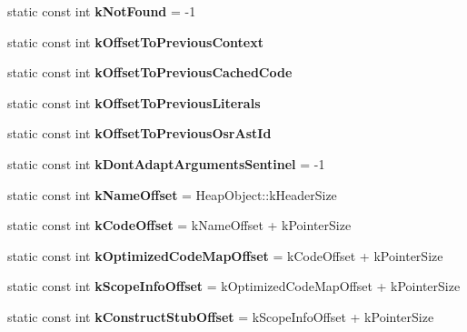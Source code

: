 \begin{DoxyCompactItemize}
\item 
static const int {\bfseries k\+Not\+Found} = -\/1\hypertarget{classv8_1_1internal_1_1_shared_function_info_a1e596df8d07293d1c359639d9b111b8f}{}\label{classv8_1_1internal_1_1_shared_function_info_a1e596df8d07293d1c359639d9b111b8f}

\item 
static const int {\bfseries k\+Offset\+To\+Previous\+Context}
\item 
static const int {\bfseries k\+Offset\+To\+Previous\+Cached\+Code}
\item 
static const int {\bfseries k\+Offset\+To\+Previous\+Literals}
\item 
static const int {\bfseries k\+Offset\+To\+Previous\+Osr\+Ast\+Id}
\item 
static const int {\bfseries k\+Dont\+Adapt\+Arguments\+Sentinel} = -\/1\hypertarget{classv8_1_1internal_1_1_shared_function_info_a64fb3ac3cd435626512d56ffb031af0f}{}\label{classv8_1_1internal_1_1_shared_function_info_a64fb3ac3cd435626512d56ffb031af0f}

\item 
static const int {\bfseries k\+Name\+Offset} = Heap\+Object\+::k\+Header\+Size\hypertarget{classv8_1_1internal_1_1_shared_function_info_a7ea21b5d46c5e7f44e66e3d26d1b600f}{}\label{classv8_1_1internal_1_1_shared_function_info_a7ea21b5d46c5e7f44e66e3d26d1b600f}

\item 
static const int {\bfseries k\+Code\+Offset} = k\+Name\+Offset + k\+Pointer\+Size\hypertarget{classv8_1_1internal_1_1_shared_function_info_ac7fe6404f9b3b09d90e90daa447751fb}{}\label{classv8_1_1internal_1_1_shared_function_info_ac7fe6404f9b3b09d90e90daa447751fb}

\item 
static const int {\bfseries k\+Optimized\+Code\+Map\+Offset} = k\+Code\+Offset + k\+Pointer\+Size\hypertarget{classv8_1_1internal_1_1_shared_function_info_a0994b68019409d0eb68a285ee9277cfc}{}\label{classv8_1_1internal_1_1_shared_function_info_a0994b68019409d0eb68a285ee9277cfc}

\item 
static const int {\bfseries k\+Scope\+Info\+Offset} = k\+Optimized\+Code\+Map\+Offset + k\+Pointer\+Size\hypertarget{classv8_1_1internal_1_1_shared_function_info_a51386ec5e82d6a4ca1f05663ea80de9d}{}\label{classv8_1_1internal_1_1_shared_function_info_a51386ec5e82d6a4ca1f05663ea80de9d}

\item 
static const int {\bfseries k\+Construct\+Stub\+Offset} = k\+Scope\+Info\+Offset + k\+Pointer\+Size\hypertarget{classv8_1_1internal_1_1_shared_function_info_a28d5211725c2457c7243651a8ad60793}{}\label{classv8_1_1internal_1_1_shared_function_info_a28d5211725c2457c7243651a8ad60793}


\end{DoxyCompactItemize}
